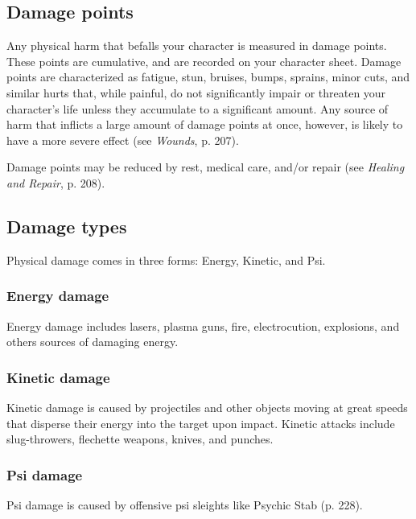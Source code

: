 \subsection{Damage points} \label{sec:damage-points} 

Any physical harm that befalls your character is measured in damage points. These points are cumulative, and are recorded on your character sheet. Damage points are characterized as fatigue, stun, bruises, bumps, sprains, minor cuts, and similar hurts that, while painful, do not significantly impair or threaten your character’s life unless they accumulate to a significant amount. Any source of harm that inflicts a large amount of damage points at once, however, is likely to have a more severe effect (see \emph{Wounds}, p. 207). 

Damage points may be reduced by rest, medical care, and/or repair (see \emph{Healing and Repair}, p. 208). 



\subsection{Damage types} \label{sec:damage-types} 

Physical damage comes in three forms: Energy, Kinetic, and Psi. 

\subsubsection{Energy damage} 

Energy damage includes lasers, plasma guns, fire, electrocution, explosions, and others sources of damaging energy. 

\subsubsection{Kinetic damage} 

Kinetic damage is caused by projectiles and other objects moving at great speeds that disperse their energy into the target upon impact. Kinetic attacks include slug-throwers, flechette weapons, knives, and punches. 

\subsubsection{Psi damage} 

Psi damage is caused by offensive psi sleights like Psychic Stab (p. 228). 



